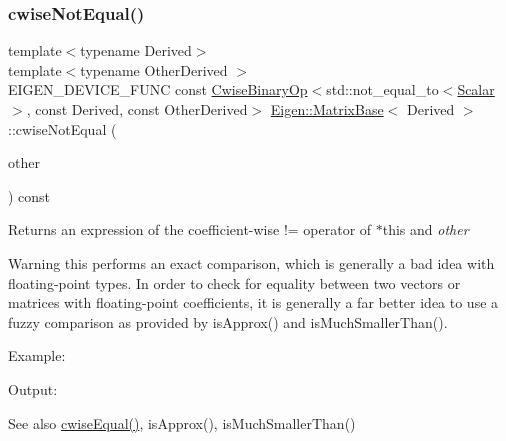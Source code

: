 \subsubsection{\texorpdfstring{cwiseNotEqual()}{cwiseNotEqual()}}
{\footnotesize\ttfamily template$<$typename Derived$>$ \\
template$<$typename Other\+Derived $>$ \\
E\+I\+G\+E\+N\+\_\+\+D\+E\+V\+I\+C\+E\+\_\+\+F\+U\+NC const \mbox{\hyperlink{class_eigen_1_1_cwise_binary_op}{Cwise\+Binary\+Op}}$<$std\+::not\+\_\+equal\+\_\+to$<$\mbox{\hyperlink{class_eigen_1_1_dense_base_a5feed465b3a8e60c47e73ecce83e39a2}{Scalar}}$>$, const Derived, const Other\+Derived$>$ \mbox{\hyperlink{class_eigen_1_1_matrix_base}{Eigen\+::\+Matrix\+Base}}$<$ Derived $>$\+::cwise\+Not\+Equal (\begin{DoxyParamCaption}\item[{const E\+I\+G\+E\+N\+\_\+\+C\+U\+R\+R\+E\+N\+T\+\_\+\+S\+T\+O\+R\+A\+G\+E\+\_\+\+B\+A\+S\+E\+\_\+\+C\+L\+A\+SS$<$ Other\+Derived $>$ \&}]{other }\end{DoxyParamCaption}) const\hspace{0.3cm}{\ttfamily [inline]}}

\begin{DoxyReturn}{Returns}
an expression of the coefficient-\/wise != operator of $\ast$this and {\itshape other} 
\end{DoxyReturn}
\begin{DoxyWarning}{Warning}
this performs an exact comparison, which is generally a bad idea with floating-\/point types. In order to check for equality between two vectors or matrices with floating-\/point coefficients, it is generally a far better idea to use a fuzzy comparison as provided by is\+Approx() and is\+Much\+Smaller\+Than().
\end{DoxyWarning}
Example\+: 
\begin{DoxyCodeInclude}{0}
\end{DoxyCodeInclude}
 Output\+: 
\begin{DoxyVerbInclude}
\end{DoxyVerbInclude}


\begin{DoxySeeAlso}{See also}
\mbox{\hyperlink{class_eigen_1_1_matrix_base_a1d63c6dd2c0c6c8186fdabdf55ee1f58}{cwise\+Equal()}}, is\+Approx(), is\+Much\+Smaller\+Than() 
\end{DoxySeeAlso}
\mbox{\label{class_eigen_1_1_matrix_base_ad2a4070503e44b1f9e7fc99b4cb5697b}} 
